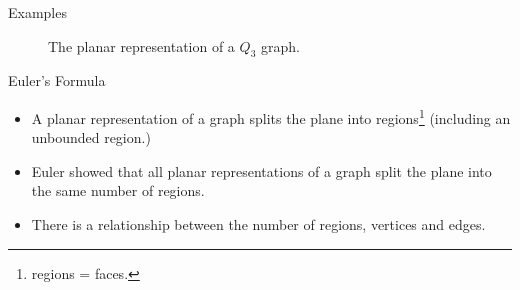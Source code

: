 \documentclass{beamer}
\theoremstyle{definition}
\begin{document}
\begin{frame}{Examples}
    \begin{figure}
        \caption{The planar representation of a $Q_3$ graph.}
    \end{figure}
\end{frame}

\begin{frame}{Euler's Formula}
    \begin{itemize}
        \item A planar representation of a graph splits the plane into regions\footnote{regions = faces.} (including an unbounded region.)
        \item Euler showed that all planar representations of a graph split the plane into the same number of regions.
        \item There is a relationship between the number of regions, vertices and edges.
    \end{itemize}
\end{frame}
\end{document}

